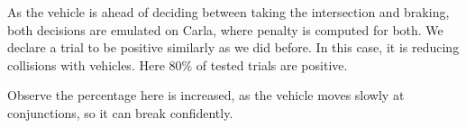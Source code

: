 As the vehicle is ahead of deciding between taking the intersection and braking, both decisions are emulated on Carla, where penalty is computed for both. We declare a trial to be positive similarly as we did before. In this case, it is reducing collisions with vehicles. Here $80 \%$ of tested trials are positive.

Observe the percentage here is increased, as the vehicle moves slowly at conjunctions, so it can break confidently.